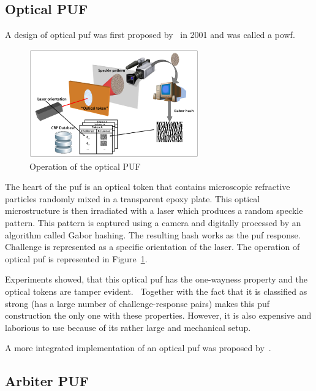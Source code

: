 \subsection{Optical PUF}\label{sec:optical_puf}

A design of optical \gls{puf} was first proposed by~\cite{Pappu2001} in 2001 and was called a \glsdesc{powf}.

\begin{figure}[h!]
    \centering
    \captionsetup{justification=centering,margin=0.5cm}
    \includegraphics[width=0.65\textwidth]{images/optical_puf.png}
    \caption[Operation of the optical PUF]{Operation of the optical PUF}
    \label{fig:optical_puf}
\end{figure}

The heart of the \gls{puf} is an optical token that contains microscopic refractive particles randomly mixed in a transparent epoxy plate. This optical microstructure is then irradiated with a laser which produces a random speckle pattern. This pattern is captured using a camera and digitally processed by an algorithm called Gabor hashing. The resulting hash works as the \gls{puf} response. Challenge is represented as a specific orientation of the laser. The operation of optical \gls{puf} is represented in Figure~\ref{fig:optical_puf}.

Experiments showed, that this optical \gls{puf} has the one-wayness property and the optical tokens are tamper evident.~\cite{Pappu2002} Together with the fact that it is classified as strong (has a large number of challenge-response pairs) makes this \gls{puf} construction the only one with these properties. However, it is also expensive and laborious to use because of its rather large and mechanical setup.~\cite{Maes2012}

A more integrated implementation of an optical \gls{puf} was proposed by~\cite{Rhrmair2013}.

\subsection{Arbiter PUF}


